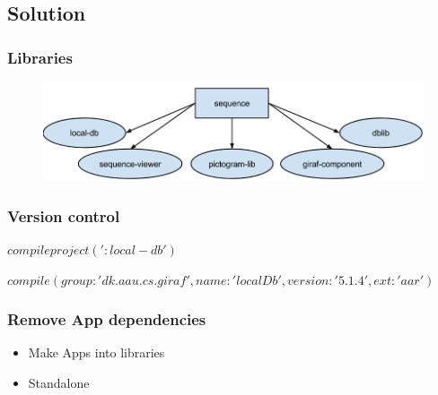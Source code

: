 \subsection{Solution}
\begin{frame}
	\frametitle{Libraries}
	\begin{figure}[H]
			\centering
			\includegraphics[width= 0.8 \textwidth]{pictures/newbuild.png}
	\end{figure}
\end{frame}
\begin{frame}
	\frametitle{Version control}
	$compile project(':local-db')$
	
	$compile(group: 'dk.aau.cs.giraf', name: 'localDb', version: '5.1.4', ext: 'aar')$
\end{frame}
\begin{frame}
	\frametitle{Remove App dependencies}
	\begin{itemize}
		\item Make Apps into libraries
		\item Standalone			
	\end{itemize}
\end{frame}
